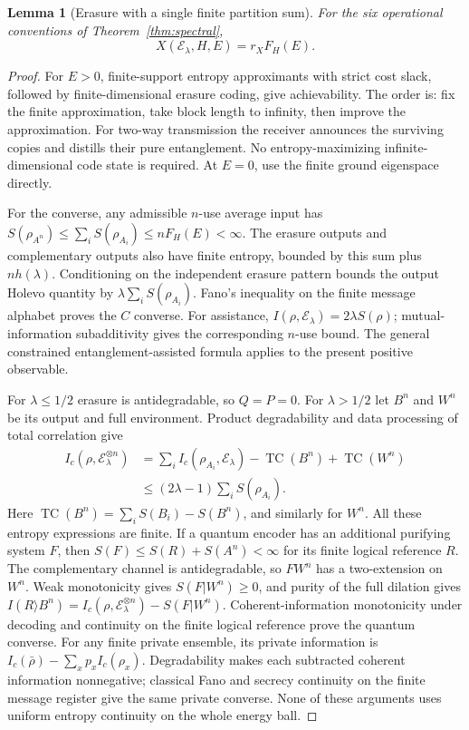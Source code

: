 \documentclass[11pt]{article}
\newtheorem{lemma}[theorem]{Lemma}
\newcommand{\Ecal}{\mathcal E_\lambda}
\begin{document}
\begin{lemma}[Erasure with a single finite partition sum]\label{lem:general-erasure}
For the six operational conventions of Theorem~\ref{thm:spectral},
\begin{equation}\label{eq:general-erasure}
 X(\Ecal,H,E)=r_XF_H(E).
\end{equation}
\end{lemma}
\begin{proof}
For $E>0$, finite-support entropy approximants with strict cost slack, followed
by finite-dimensional erasure coding, give achievability. The order
is: fix the finite approximation, take block length to infinity,
then improve the approximation. For two-way transmission the
receiver announces the surviving copies and distills their pure
entanglement. No entropy-maximizing infinite-dimensional code state
is required. At $E=0$, use the finite ground eigenspace directly.

For the converse, any admissible $n$-use average input has
$S(\rho_{A^n})\le\sum_iS(\rho_{A_i})\le nF_H(E)<\infty$.
The erasure outputs and complementary outputs also have finite
entropy, bounded by this sum plus $nh(\lambda)$.
Conditioning on the independent erasure pattern bounds the output
Holevo quantity by $\lambda\sum_i S(\rho_{A_i})$.
Fano's inequality on the finite message alphabet proves the $C$
converse. For assistance, $I(\rho,\Ecal)=2\lambda S(\rho)$;
mutual-information subadditivity gives the corresponding $n$-use
bound. The general constrained entanglement-assisted formula
\cite[Theorem 1]{hs} applies to the present positive observable.

For $\lambda\le1/2$ erasure is antidegradable, so $Q=P=0$.
For $\lambda>1/2$ let $B^n$ and $W^n$ be its output and full
environment. Product degradability and data processing of total
correlation give
\begin{align*}
 I_c(\rho,\Ecal^{\otimes n})
 &=\sum_i I_c(\rho_{A_i},\Ecal)
       -\operatorname{TC}(B^n)+\operatorname{TC}(W^n)\\
 &\le(2\lambda-1)\sum_i S(\rho_{A_i}).
\end{align*}
Here $\operatorname{TC}(B^n)=\sum_iS(B_i)-S(B^n)$, and similarly
for $W^n$. All these entropy expressions are finite. If a quantum encoder has
an additional purifying system $F$, then
$S(F)\le S(R)+S(A^n)<\infty$ for its finite logical reference $R$.
The complementary channel is antidegradable, so $FW^n$ has a
two-extension on $W^n$. Weak monotonicity gives $S(F|W^n)\ge0$,
and purity of the full dilation gives
$I(R\rangle B^n)=I_c(\rho,\Ecal^{\otimes n})-S(F|W^n)$.
Coherent-information monotonicity under decoding and continuity on
the finite logical reference prove the quantum converse.
For any finite private ensemble, its private information is
$I_c(\bar\rho)-\sum_xp_x I_c(\rho_x)$.
Degradability makes each subtracted coherent information nonnegative;
classical Fano and secrecy continuity on the finite message register
give the same private converse. None of these arguments uses uniform
entropy continuity on the whole energy ball.


\end{proof}
\end{document}
